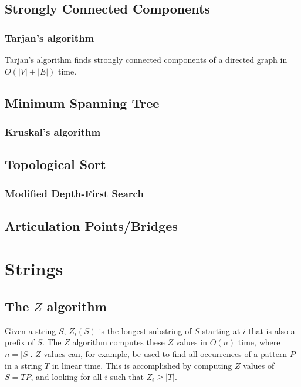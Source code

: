 \documentclass[11pt,a4paper,titlepage]{article}
\begin{document}
		\subsection{Strongly Connected Components}
			\subsubsection{Tarjan's algorithm}
				Tarjan's algorithm finds strongly connected components of a directed graph in $O(|V|+|E|)$ time.
				
		\subsection{Minimum Spanning Tree}
			\subsubsection{Kruskal's algorithm}
				
		\subsection{Topological Sort}
			\subsubsection{Modified Depth-First Search}
				
		\subsection{Articulation Points/Bridges}

	\section{Strings}
		\subsection{The $Z$ algorithm}
			Given a string $S$, $Z_i(S)$ is the longest substring of $S$ starting at $i$ that is also a prefix of $S$. The $Z$ algorithm computes these $Z$ values in $O(n)$ time, where $n = |S|$. $Z$ values can, for example, be used to find all occurrences of a pattern $P$ in a string $T$ in linear time. This is accomplished by computing $Z$ values of $S = T P$, and looking for all $i$ such that $Z_i \geq |T|$.
\end{document}
